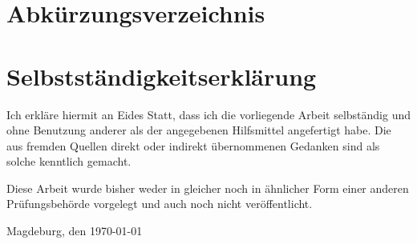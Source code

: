 \documentclass[twoside, 12pt, a4paper, openright, fleqn, cleardoublepages=empty]{scrreprt}
\begin{document}
\ifdefined\myShowAcronyms
\renewcommand{\baselinestretch}{1.3}
\small\normalsize
\chapter*{Abkürzungsverzeichnis}

\lstlistoflistings
{}
\renewcommand{\baselinestretch}{1}
\small\normalsize
\cleardoublepage
\fi

\ifdefined\myShowTodos
\renewcommand{\baselinestretch}{1.3}
\small\normalsize
\listoftodos
{}
\renewcommand{\baselinestretch}{1}
\small\normalsize
\cleardoublepage
\fi

\setcounter{page}{1}
\pagestyle{scrheadings}



\cleardoublepage


\cleardoublepage

\pagestyle{empty}
\chapter*{Selbstst\"andigkeitserkl\"arung}

Ich erkl\"are hiermit an Eides Statt, dass ich die vorliegende Arbeit
selbst\"andig und ohne Benutzung anderer als der angegebenen Hilfsmittel
angefertigt habe. Die aus fremden Quellen direkt oder indirekt \"ubernommenen
Gedanken sind als solche kenntlich gemacht.

Diese Arbeit wurde bisher weder in gleicher noch in \"ahnlicher Form einer
anderen Pr\"ufungsbeh\"orde vorgelegt und auch noch nicht ver\"offentlicht.

\vspace*{1.5cm}Magdeburg, den \today
\hspace*{\fill}\myAuthorFirst\ \myAuthorFamily

\end{document}
